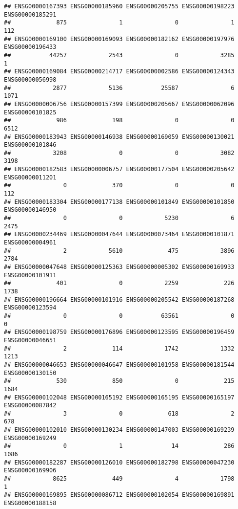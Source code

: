 \documentclass[
]{article}
\begin{document}
\begin{verbatim}
## ENSG00000167393 ENSG00000185960 ENSG00000205755 ENSG00000198223 ENSG00000185291 
##             875               1               0               1             112 
## ENSG00000169100 ENSG00000169093 ENSG00000182162 ENSG00000197976 ENSG00000196433 
##           44257            2543               0            3285               1 
## ENSG00000169084 ENSG00000214717 ENSG00000002586 ENSG00000124343 ENSG00000056998 
##            2877            5136           25587               6            1071 
## ENSG00000006756 ENSG00000157399 ENSG00000205667 ENSG00000062096 ENSG00000101825 
##             986             198               0               0            6512 
## ENSG00000183943 ENSG00000146938 ENSG00000169059 ENSG00000130021 ENSG00000101846 
##            3208               0               0            3082            3198 
## ENSG00000182583 ENSG00000006757 ENSG00000177504 ENSG00000205642 ENSG00000011201 
##               0             370               0               0             112 
## ENSG00000183304 ENSG00000177138 ENSG00000101849 ENSG00000101850 ENSG00000146950 
##               0               0            5230               6            2475 
## ENSG00000234469 ENSG00000047644 ENSG00000073464 ENSG00000101871 ENSG00000004961 
##               2            5610             475            3896            2784 
## ENSG00000047648 ENSG00000125363 ENSG00000005302 ENSG00000169933 ENSG00000101911 
##             401               0            2259             226            1738 
## ENSG00000196664 ENSG00000101916 ENSG00000205542 ENSG00000187268 ENSG00000123594 
##               0               0           63561               0               0 
## ENSG00000198759 ENSG00000176896 ENSG00000123595 ENSG00000196459 ENSG00000046651 
##               2             114            1742            1332            1213 
## ENSG00000046653 ENSG00000046647 ENSG00000101958 ENSG00000181544 ENSG00000130150 
##             530             850               0             215            1684 
## ENSG00000102048 ENSG00000165192 ENSG00000165195 ENSG00000165197 ENSG00000087842 
##               3               0             618               2             678 
## ENSG00000102010 ENSG00000130234 ENSG00000147003 ENSG00000169239 ENSG00000169249 
##               0               1              14             286            1086 
## ENSG00000182287 ENSG00000126010 ENSG00000182798 ENSG00000047230 ENSG00000169906 
##            8625             449               4            1798               1 
## ENSG00000169895 ENSG00000086712 ENSG00000102054 ENSG00000169891 ENSG00000188158 

\end{verbatim}
\end{document}

